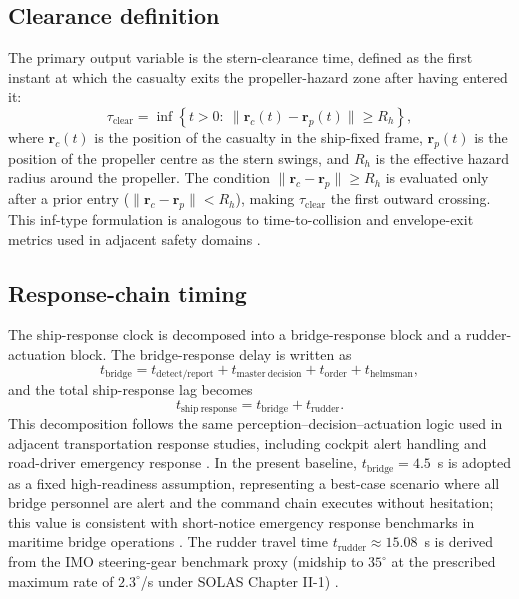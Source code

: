 \documentclass[preprint,12pt]{elsarticle}
\begin{document}
\subsection{Clearance definition}
The primary output variable is the stern-clearance time, defined as the first instant at which the casualty exits the propeller-hazard zone after having entered it:
\begin{equation}
\tau_{\mathrm{clear}} = \inf\left\{t>0:\ \|\mathbf{r}_c(t)-\mathbf{r}_p(t)\|\ge R_h\right\},
\end{equation}
where $\mathbf{r}_c(t)$ is the position of the casualty in the ship-fixed frame, $\mathbf{r}_p(t)$ is the position of the propeller centre as the stern swings, and $R_h$ is the effective hazard radius around the propeller. The condition $\|\mathbf{r}_c-\mathbf{r}_p\|\ge R_h$ is evaluated only after a prior entry ($\|\mathbf{r}_c-\mathbf{r}_p\|<R_h$), making $\tau_{\mathrm{clear}}$ the first outward crossing. This inf-type formulation is analogous to time-to-collision and envelope-exit metrics used in adjacent safety domains \cite{ref_land_aeb,ref_aviation_envelope}.

\subsection{Response-chain timing}
The ship-response clock is decomposed into a bridge-response block and a rudder-actuation block. The bridge-response delay is written as
\begin{equation}
t_{\mathrm{bridge}} = t_{\mathrm{detect/report}} + t_{\mathrm{master\ decision}} + t_{\mathrm{order}} + t_{\mathrm{helmsman}},
\end{equation}
and the total ship-response lag becomes
\begin{equation}
t_{\mathrm{ship\ response}} = t_{\mathrm{bridge}} + t_{\mathrm{rudder}}.
\end{equation}
This decomposition follows the same perception--decision--actuation logic used in adjacent transportation response studies, including cockpit alert handling and road-driver emergency response \cite{ref_aviation_alerts,ref_land_detection,ref_land_aeb}. In the present baseline, $t_{\mathrm{bridge}}=4.5$~s is adopted as a fixed high-readiness assumption, representing a best-case scenario where all bridge personnel are alert and the command chain executes without hesitation; this value is consistent with short-notice emergency response benchmarks in maritime bridge operations \cite{ref_solas,ref_iamsar}. The rudder travel time $t_{\mathrm{rudder}}\approx 15.08$~s is derived from the IMO steering-gear benchmark proxy (midship to $35^{\circ}$ at the prescribed maximum rate of $2.3^{\circ}$/s under SOLAS Chapter II-1) \cite{ref_solas}.
\end{document}
